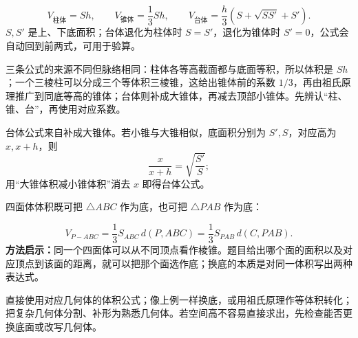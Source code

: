 \begin{corollarybox}[柱、锥、台的统一体积公式]
  \[
    V_{\text{柱体}}=Sh,
    \qquad
    V_{\text{锥体}}=\frac13Sh,
    \qquad
    V_{\text{台体}}=\frac h3\left(S+\sqrt{SS'}+S'\right).
  \]
  $S,S'$ 是上、下底面积；台体退化为柱体时 $S=S'$，退化为锥体时 $S'=0$，公式会自动回到前两式，可用于验算。
\end{corollarybox}

三条公式的来源不同但脉络相同：柱体各等高截面都与底面等积，所以体积是 $Sh$；一个三棱柱可以分成三个等体积三棱锥，这给出锥体前的系数 $1/3$，再由祖氏原理推广到同底等高的锥体；台体则补成大锥体，再减去顶部小锥体。先辨认“柱、锥、台”，再使用对应系数。

台体公式来自补成大锥体。若小锥与大锥相似，底面积分别为 $S',S$，对应高为 $x,x+h$，则
\[
  \frac{x}{x+h}=\sqrt{\frac{S'}S};
\]
用“大锥体积减小锥体积”消去 $x$ 即得台体公式。

\begin{examplebox}
  四面体体积既可把 $\triangle ABC$ 作为底，也可把 $\triangle PAB$ 作为底：
  \begin{center}
  \end{center}
  \[
    V_{P-ABC}=\frac13S_{ABC}\,d(P,ABC)
    =\frac13S_{PAB}\,d(C,PAB).
  \]
  \textbf{方法启示：}同一个四面体可以从不同顶点看作棱锥。题目给出哪个面的面积以及对应顶点到该面的距离，就可以把那个面选作底；换底的本质是对同一体积写出两种表达式。
\end{examplebox}

\begin{corollarybox}[体积题的三条路线]
  直接使用对应几何体的体积公式；像上例一样换底，或用祖氏原理作等体积转化；把复杂几何体分割、补形为熟悉几何体。若空间高不容易直接求出，先检查能否更换底面或改写几何体。
\end{corollarybox}


